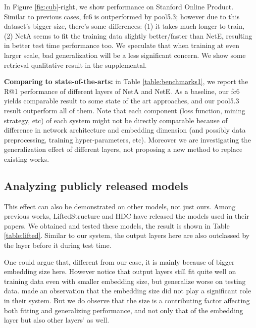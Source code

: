 \documentclass[10pt,twocolumn,letterpaper]{article}
\begin{document}
In Figure \ref{fig:cub}-right, we show performance on Stanford Online Product. Similar to previous cases, fc6 is outperformed by pool5.3; however due to this dataset's bigger size, there's some differences: (1) it takes much longer to train, (2) NetA seems to fit the training data slightly better/faster than NetE, resulting in better test time performance too. We speculate that when training at even larger scale, bad generalization will be a less significant concern. We show some retrieval qualitative result in the supplemental.

\textbf{Comparing to state-of-the-arts:} in Table \ref{table:benchmarks1}, we report the R@1 performance of different layers of NetA and NetE. As a baseline, our fc6 yields comparable result to some state of the art approaches, and our pool5.3 result outperform all of them. Note that each component (loss function, mining strategy, etc) of each system might not be directly comparable because of difference in network architecture and embedding dimension (and possibly data preprocessing, training hyper-parameters, etc). Moreover we are investigating the generalization effect of different layers, not proposing a new method to replace existing works.






  
\subsection{Analyzing publicly released models}



This effect can also be demonstrated on other models, not just ours. Among previous works, LiftedStructure \cite{oh2016deep} and HDC \cite{yuan2016hard} have released the models used in their papers. We obtained and tested these models, the result is shown in Table \ref{table:lifted}. Similar to our system, the output layers here are also outclassed by the layer before it during test time.

One could argue that, different from our case, it is mainly because of bigger embedding size here. However notice that output layers still fit quite well on training data even with smaller embedding size, but generalize worse on testing data. \cite{oh2016deep} made an observation that the embedding size did not play a significant role in their system. But we do observe that the size is a contributing factor affecting both fitting and generalizing performance, and not only that of the embedding layer but also other layers' as well.
\end{document}
